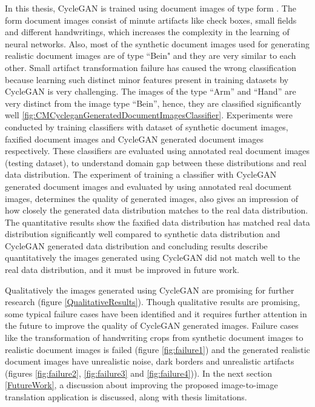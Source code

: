 In this thesis, \ac{CycleGAN} is trained using document images of type form . The form document images consist of minute artifacts like check boxes, small fields and different handwritings, which increases the complexity in the learning of neural networks. Also, most of the synthetic document images used for generating realistic document images are of type ``Bein" and they are very similar to each other. Small artifact transformation failure has caused the wrong classification because learning such distinct minor features present in training datasets by \ac{CycleGAN} is very challenging. The images of the type ``Arm'' and ``Hand'' are very distinct from the image type ``Bein'', hence, they are classified significantly well \ref{fig:CMCycleganGeneratedDocumentImagesClassifier}. Experiments were conducted by training classifiers with dataset of synthetic document images, faxified document images and \ac{CycleGAN} generated document images respectively. These classifiers are evaluated using annotated real document images (testing dataset), to understand domain gap between these distributions and real data distribution. The experiment of training a classifier with \ac{CycleGAN} generated document images and evaluated by using annotated real document images, determines the quality of generated images, also gives an impression of how closely the generated data distribution matches to the real data distribution. The quantitative results show the faxified data distribution has matched real data distribution significantly well compared to synthetic data distribution and \ac{CycleGAN} generated data distribution and concluding results describe quantitatively the images generated using \ac{CycleGAN} did not match well to the real data distribution, and it must be improved in future work.

Qualitatively the images generated using \ac{CycleGAN} are promising for further research (figure \ref{QualitativeResults}). Though qualitative results are promising, some typical failure cases have been identified and it requires further attention in the future to improve the quality of \ac{CycleGAN} generated images. Failure cases like the transformation of handwriting crops from synthetic document images to realistic document images is failed (figure \ref{fig:failure1}) and the generated realistic document images have unrealistic noise, dark borders and unrealistic artifacts (figures \ref{fig:failure2}, \ref{fig:failure3} and \ref{fig:failure4})). In the next section \ref{FutureWork}, a discussion about improving the proposed image-to-image translation application is discussed, along with thesis limitations.

